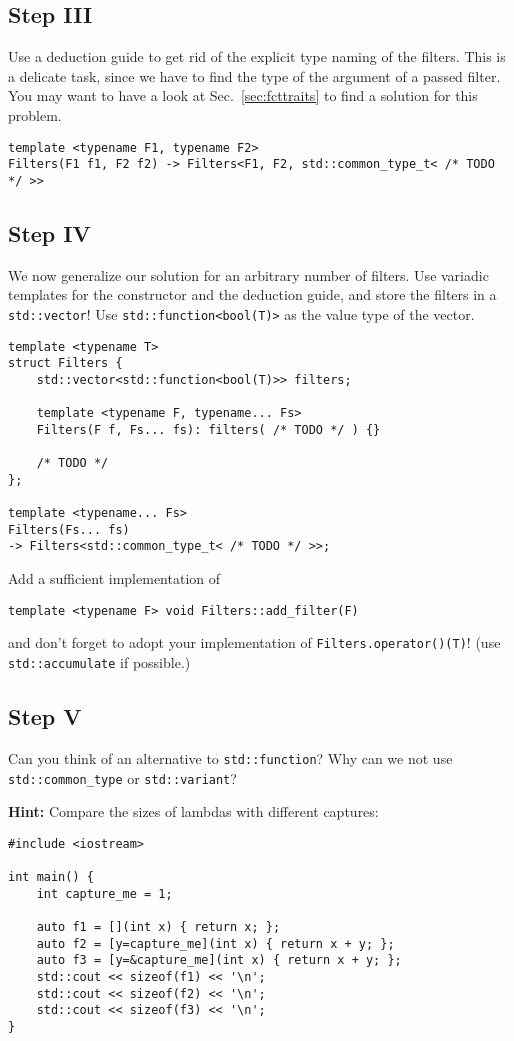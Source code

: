 \subsection{Step III}
Use a deduction guide to get rid of the explicit type naming of the filters. This is a delicate task, since we have to find the type of the argument of a passed filter. You may want to have a look at Sec.~\ref{sec:fcttraits} to find a solution for this problem.
\begin{lstlisting}
template <typename F1, typename F2>
Filters(F1 f1, F2 f2) -> Filters<F1, F2, std::common_type_t< /* TODO */ >>
\end{lstlisting}

\subsection{Step IV}
We now generalize our solution for an arbitrary number of filters. Use variadic templates for the constructor and the deduction guide, and store the filters in a \texttt{std::vector}! Use \texttt{std::function<bool(T)>} as the value type of the vector.

\begin{lstlisting}
template <typename T>
struct Filters {
    std::vector<std::function<bool(T)>> filters;

    template <typename F, typename... Fs>
    Filters(F f, Fs... fs): filters( /* TODO */ ) {}
    
    /* TODO */
};

template <typename... Fs>
Filters(Fs... fs)
-> Filters<std::common_type_t< /* TODO */ >>;
\end{lstlisting}
Add a sufficient implementation of
\begin{lstlisting}
template <typename F> void Filters::add_filter(F)
\end{lstlisting}
and don't forget to adopt your implementation of \texttt{Filters.operator()(T)}! (use \texttt{std::accumulate} if possible.)

\subsection{Step V}
Can you think of an alternative to \texttt{std::function}? Why can we not use \texttt{std::common\_type} or \texttt{std::variant}?

\textbf{Hint:} Compare the sizes of lambdas with different captures:
\begin{lstlisting}[title=\href{https://godbolt.org/z/o3bPso}{\texttt{godbolt.org/z/o3bPso}}]
#include <iostream>

int main() {
    int capture_me = 1;

    auto f1 = [](int x) { return x; };
    auto f2 = [y=capture_me](int x) { return x + y; };
    auto f3 = [y=&capture_me](int x) { return x + y; };
    std::cout << sizeof(f1) << '\n';
    std::cout << sizeof(f2) << '\n';
    std::cout << sizeof(f3) << '\n';
}
\end{lstlisting}

